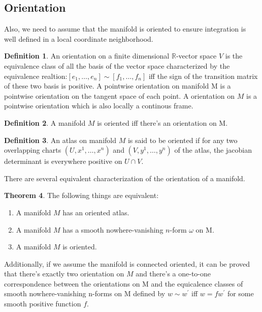 \documentclass[b5paper,12pt]{article}
\newcommand{\bb}[1]{\mathbb{#1}}
\newcommand{\p}{^{\prime}}
\theoremstyle{definition}
\newtheorem{defn}{Definition}[section]
\newtheorem{theo}[defn]{Theorem}
\begin{document}
\subsection{Orientation}
Also, we need to assume that the manifold is oriented to ensure integration is well defined in a local coordinate neighborhood.
\begin{defn}
    An orientation on a finite dimensional $\bb{R}$-vector space $V$ is the equivalence class of all the basis of the vector space characterized by the equivalence realtion:$\left[e_1,\dots,e_n\right]\sim \left[f_1,\dots,f_n\right]$ iff the sign of the transition matrix of these two basis is positive.
    A pointwise orientation on manifold M is a pointwise orientation
    on the tangent space of each point. A orientation on $M$ is a pointwise orientation which is also locally a continous frame.
\end{defn}
\begin{defn}
    A manifold $M$ is oriented iff there's an orientation on M.
\end{defn}
\begin{defn}
    An atlas on manifold $M$ is said to be oriented if for any two overlapping charts $(U,x^1,\dots,x^n)$ and $(V,y^1,\dots,y^n)$ of the atlas, the jacobian determinant is everywhere positive on $U\cap V$.
\end{defn}
There are several equivalent characterization of the orientation of a manifold.
\begin{theo}
    The following things are equivalent:
    \begin{enumerate}
        \item A manifold $M$ has an oriented atlas.
        \item A manifold $M$ has a smooth nowhere-vanishing $n$-form $\omega$ on M.
        \item A manifold $M$ is oriented.
    \end{enumerate}
\end{theo}
Additionally, if we assume the manifold is connected oriented, it can be proved that there's exactly two orientation on $M$ and there's a one-to-one
correspondence between the orientations on M and the equicalence classes of smooth nowhere-vanishing n-forms on M  defined by $w\sim w\p$ iff $w=fw\p$ for some smooth positive function $f$.
\end{document}
